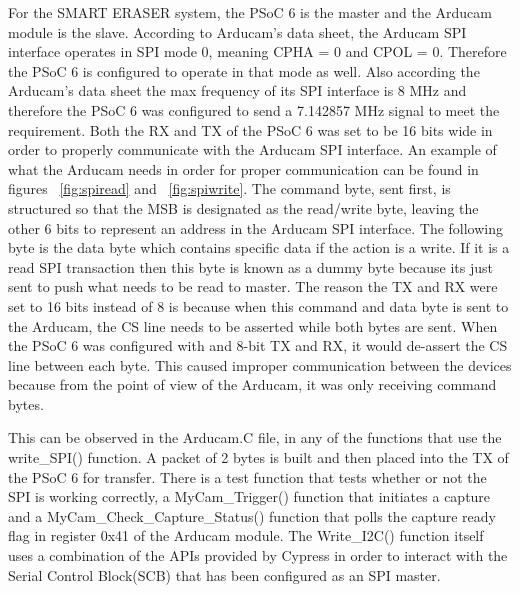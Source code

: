 \setlength{\parindent}{2.5ex} 
For the SMART ERASER system, the PSoC 6 is the master and the Arducam module is the slave. According to Arducam's data sheet, the Arducam SPI interface operates in SPI mode 0, meaning CPHA = 0 and CPOL = 0. Therefore the PSoC 6 is configured to operate in that mode as well. Also according the Arducam's data sheet the max frequency of its SPI interface is 8 MHz and therefore the PSoC 6 was configured to send a 7.142857 MHz signal to meet the requirement. Both the RX and TX of the PSoC 6 was set to be 16 bits wide in order to properly communicate with the Arducam SPI interface. An example of what the Arducam needs in order for proper communication can be found in figures ~\ref{fig:spiread} and  ~\ref{fig:spiwrite}. The command byte, sent first, is structured so that the MSB is designated as the read/write byte, leaving the other 6 bits to represent an address in the Arducam SPI interface. The following byte is the data byte which contains specific data if the action is a write. If it is a read SPI transaction then this byte is known as a dummy byte because its just sent to push what needs to be read to master. The reason the TX and RX were set to 16 bits instead of 8 is because when this command and data byte is sent to the Arducam, the CS line needs to be asserted while both bytes are sent. When the PSoC 6 was configured with and 8-bit TX and RX, it would de-assert the CS line between each byte. This caused improper communication between the devices because from the point of view of the Arducam, it was only receiving command bytes.\par
\setlength{\parindent}{2.5ex}
This can be observed in the Arducam.C file, in any of the functions that use the write\_SPI() function. A packet of 2 bytes is built and then placed into the TX of the PSoC 6 for transfer. There is a test function that tests whether or not the SPI is working correctly, a MyCam\_Trigger() function that initiates a capture and a MyCam\_Check\_Capture\_Status() function that polls the capture ready flag in register 0x41 of the Arducam module. The Write\_I2C() function itself uses a combination of the APIs provided by Cypress in order to interact with the Serial Control Block(SCB) that has been configured as an SPI master.

